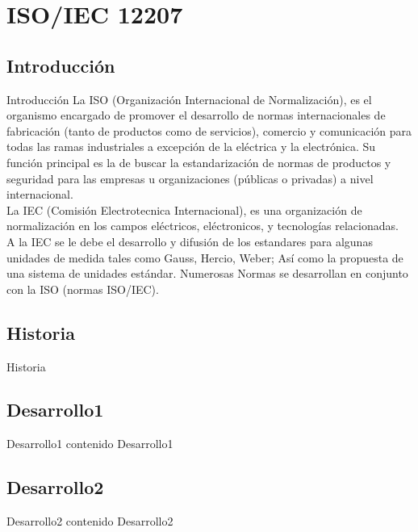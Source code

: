 \documentclass[]{beamer}
\begin{document}
\section{ISO/IEC 12207}
		\subsection{Introducci\'on}
			\begin{frame}{Introducci\'on}
				La ISO (Organización Internacional de Normalización), es el organismo encargado de promover el desarrollo de normas internacionales de fabricación (tanto de productos como de servicios), comercio y comunicación para todas las ramas industriales a excepción de la eléctrica y la electrónica. Su función principal es la de buscar la estandarización de normas de productos y seguridad para las empresas u organizaciones (públicas o privadas) a nivel internacional.\\ \smallskip
				La IEC (Comisión Electrotecnica Internacional), es una organización de normalización en los campos eléctricos, eléctronicos, y tecnologías relacionadas.\\ \smallskip
				A la IEC se le debe el desarrollo y difusión de los estandares para algunas unidades de medida tales como Gauss, Hercio, Weber; Así como la propuesta de una sistema de unidades estándar. Numerosas Normas se desarrollan en conjunto con la ISO (normas ISO/IEC).
			\end{frame}
		
		\subsection{Historia}
			\begin{frame}{Historia}
				
			\end{frame}
			
		\subsection{Desarrollo1}
			\begin{frame}{Desarrollo1}
				contenido Desarrollo1
			\end{frame}

		\subsection{Desarrollo2}
			\begin{frame}{Desarrollo2}
				contenido Desarrollo2
			\end{frame}
			
\end{document}
